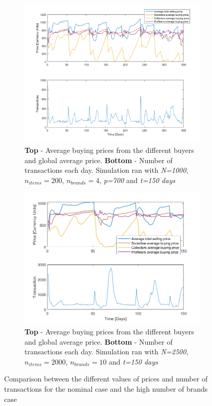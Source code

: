 \documentclass[12pt]{article}
\begin{document}
\begin{figure}
\begin{subfigure}{0.5\textwidth}
    \centering
    \includegraphics[width=\textwidth]{Nominal_Out/Avrg-prcs2nom.png}
    \caption{\textbf{Top} - Average buying prices from the different buyers and global average price. \textbf{Bottom} - Number of transactions each day. Simulation ran with \textit{N=1000}, \textit{$n_{items}=200$}, \textit{$n_{brands}=4$}, \textit{p=700} and \textit{t=150 days}}
\end{subfigure}
\begin{subfigure}{0.5\textwidth}
      \centering
    \includegraphics[width=\textwidth]{Brands/Avgp_brands.png}
    \caption{\textbf{Top} - Average buying prices from the different buyers and global average price. \textbf{Bottom} - Number of transactions each day. Simulation ran with \textit{N=2500}, \textit{$n_{items}=2000$}, \textit{$n_{brands}=10$} and \textit{t=150 days}}
    \label{avgbrands}
\end{subfigure}
\caption{Comparison between the different values of prices and number of transactions for the nominal case and the high number of brands case}
\label{compavgbrands}
\end{figure}
\end{document}
